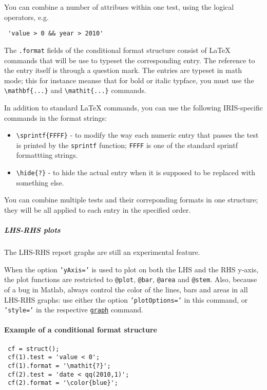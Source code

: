  You can combine a number of attribues within one test, using the logical
 operators, e.g.
 
 \begin{verbatim}
 'value > 0 && year > 2010'
 \end{verbatim}
 
 The \texttt{.format} fields of the conditional format structure consist
 of LaTeX commands that will be use to typeset the corresponding entry.
 The reference to the entry itself is through a question mark. The
 entries are typeset in math mode; this for instance meanse that for bold
 or italic typface, you must use the
 \texttt{\textbackslash{}mathbf\{...\}} and
 \texttt{\textbackslash{}mathit\{...\}} commands.
 
 In addition to standard LaTeX commands, you can use the following
 IRIS-specific commands in the format strings:
 
 \begin{itemize}
 \item
   \texttt{\textbackslash{}sprintf\{FFFF\}} - to modify the way each
   numeric entry that passes the test is printed by the \texttt{sprintf}
   function; \texttt{FFFF} is one of the standard sprintf formattting
   strings.
 \item
   \texttt{\textbackslash{}hide\{?\}} - to hide the actual entry when it
   is supposed to be replaced with something else.
 \end{itemize}
 
 You can combine multiple tests and their correponding formats in one
 structure; they will be all applied to each entry in the specified
 order.
 
 \subparagraph{LHS-RHS plots}
 
 The LHS-RHS report graphs are still an experimental feature.
 
 When the option \texttt{'yAxis='} is used to plot on both the LHS and
 the RHS y-axis, the plot functions are restricted to \texttt{@plot},
 \texttt{@bar}, \texttt{@area} and \texttt{@stem}. Also, because of a bug
 in Matlab, always control the color of the lines, bars and areas in all
 LHS-RHS graphs: use either the option \texttt{'plotOptions='} in this
 command, or \texttt{'style='} in the respective
 \href{report/graph}{\texttt{graph}} command.
 
 \paragraph{Example of a conditional format structure}
 
 \begin{verbatim}
 cf = struct();
 cf(1).test = 'value < 0';
 cf(1).format = '\mathit{?}';
 cf(2).test = 'date < qq(2010,1)';
 cf(2).format = '\color{blue}';
 \end{verbatim}


